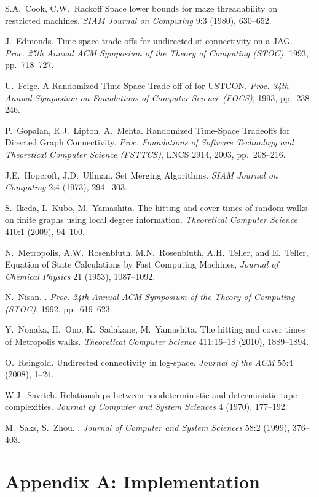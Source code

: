\documentclass[11pt,a4paper]{article}
\renewcommand{\*}{\hspace*{5mm}}
\begin{document}
\begin{thebibliography}{19}
S.A.~Cook, C.W.~Rackoff
Space lower bounds for maze threadability on restricted machines.
\emph{SIAM Journal on Computing }9:3 (1980), 630--652.

J.~Edmonds.
Time-space trade-offs for undirected st-connectivity on a JAG.
\emph{Proc. 25th Annual ACM Symposium of the Theory of Computing (STOC)}, 1993, pp.~718--727.

U.~Feige.
A Randomized Time-Space Trade-off of  for USTCON.
\emph{Proc. 34th Annual Symposium on Foundations of Computer Science (FOCS)}, 1993, pp.~238--246.

P.~Gopalan, R.J.~Lipton, A.~Mehta.
Randomized Time-Space Tradeoffs for Directed Graph Connectivity.
\emph{Proc. Foundations of Software Technology and Theoretical Computer Science (FSTTCS)}, LNCS 2914, 2003, pp.~208--216.

J.E.~Hopcroft, J.D.~Ullman.
Set Merging Algorithms.
\emph{SIAM Journal on Computing }2:4 (1973), 294-–303.

S.~Ikeda, I.~Kubo, M.~Yamashita.
The hitting and cover times of random walks on finite graphs using local degree information.
\emph{Theoretical Computer Science }410:1 (2009), 94--100.

N.~Metropolis, A.W.~Rosenbluth, M.N.~Rosenbluth, A.H.~Teller, and E.~Teller,
Equation of State Calculations by Fast Computing Machines,
\emph{Journal of Chemical Physics} 21 (1953), 1087--1092.

N.~Nisan.
.
\emph{Proc. 24th Annual ACM Symposium of the Theory of Computing (STOC)}, 1992, pp.~619--623.

Y.~Nonaka, H.~Ono, K.~Sadakane, M.~Yamashita.
The hitting and cover times of Metropolis walks.
\emph{Theoretical Computer Science} 411:16--18 (2010), 1889--1894.

O.~Reingold.
Undirected connectivity in log-space.
\emph{Journal of the ACM} 55:4 (2008), 1--24.

W.J.~Savitch.
Relationships between nondeterministic and deterministic tape complexities.
\emph{Journal of Computer and System Sciences} 4 (1970), 177--192.

M.~Saks, S.~Zhou.
.
\emph{Journal of Computer and System Sciences} 58:2 (1999), 376--403.

\end{thebibliography}

\newpage
\section*{Appendix A: Implementation}
\end{document}
